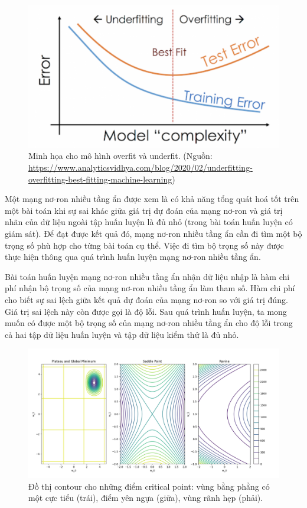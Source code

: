 \begin{figure}[htp]
	\centering
	\includegraphics[width=100 mm]{images/under-over.png}
	\caption{Minh họa cho mô hình overfit và underfit. (Nguồn: \url{https://www.analyticsvidhya.com/blog/2020/02/underfitting-overfitting-best-fitting-machine-learning})}
	\label{fig:under-over}
\end{figure}

Một mạng nơ-ron nhiều tầng ẩn được xem là có khả năng tổng quát hoá tốt trên một bài toán khi sự sai khác giữa giá trị dự đoán của mạng nơ-ron và giá trị nhãn của dữ liệu ngoài tập huấn luyện là đủ nhỏ (trong bài toán huấn luyện có giám sát). Để đạt được kết quả đó, mạng nơ-ron nhiều tầng ẩn cần đi tìm một bộ trọng số phù hợp cho từng bài toán cụ thể. Việc đi tìm bộ trọng số này được thực hiện thông qua quá trình huấn luyện mạng nơ-ron nhiều tầng ẩn.

Bài toán huấn luyện mạng nơ-ron nhiều tầng ẩn nhận dữ liệu nhập là hàm chi phí nhận bộ trọng số của mạng nơ-ron nhiều tầng ẩn làm tham số. Hàm chi phí cho biết sự sai lệch giữa kết quả dự đoán của mạng nơ-ron so với giá trị đúng. Giá trị sai lệch này còn được gọi là độ lỗi. Sau quá trình huấn luyện, ta mong muốn có được một bộ trọng số của mạng nơ-ron nhiều tầng ẩn cho độ lỗi trong cả hai tập dữ liệu huấn luyện và tập dữ liệu kiểm thử là đủ nhỏ.

\begin{figure}[htp]
	\centering
	\includegraphics[width=120 mm]{images/cricial-point-contour.png}
	\caption{Đồ thị contour cho những điểm critical point: vùng bằng phẳng có một cực tiểu (trái), điểm yên ngựa (giữa), vùng rãnh hẹp (phải).}
	\label{fig:cricial-point-contour}
\end{figure}

